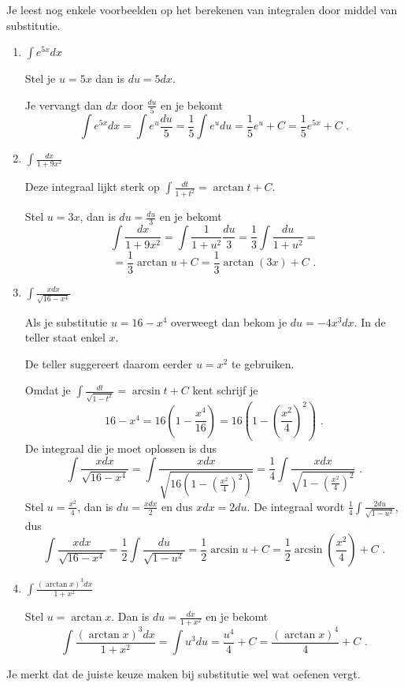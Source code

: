 \documentclass{article}
\begin{document}
Je leest nog enkele voorbeelden op het berekenen van integralen door middel van substitutie.

\vspace{2mm}

\begin{enumerate}

\item $\int e^{5x}dx$

Stel je $u=5x$ dan is $du=5dx$.

Je vervangt dan $dx$ door $\frac{du}{5}$ en je bekomt
\[
\int e^{5x}dx=\int e^u\frac{du}{5}=\frac{1}{5} \int e^udu=\frac{1}{5} e^u+C=\frac{1}{5}e^{5x}+C \text { .}
\]

\item $\int \frac{dx}{1+9x^2}$

Deze integraal lijkt sterk op $\int \frac{dt}{1+t^2}=\arctan t+C$.

Stel $u=3x$, dan is $du=\frac{du}{3}$ en je bekomt
\[
\int \frac{dx}{1+9x^2}=\int \frac{1}{1+u^2} \frac{du}{3} =\frac{1}{3} \int \frac{du}{1+u^2}=
\]
\[
=\frac{1}{3} \arctan u+C=\frac{1}{3} \arctan (3x)+C \text { .}
\]

\item $\int \frac{xdx}{\sqrt{16-x^4}}$

Als je substitutie $u=16-x^4$ overweegt dan bekom je $du=-4x^3dx$.
In de teller staat enkel $x$.

De teller suggereert daarom eerder $u=x^2$ te gebruiken.

Omdat je $\int \frac{dt}{\sqrt {1-t^2}}=\arcsin t+C$ kent schrijf je 
\[
16-x^4=16\left( 1-\frac{x^4}{16} \right)=16 \left( 1-\left( \frac{x^2}{4} \right)^2 \right) \text { .}
\]
De integraal die je moet oplossen is dus
\[
\int \frac{xdx}{\sqrt{16-x^4}}=\int \frac{xdx}{\sqrt {16 \left( 1-\left( \frac{x^2}{4} \right)^2 \right)   }}=\frac{1}{4} \int \frac{xdx}{ \sqrt{ 1-\left( \frac{x^2}{4} \right)^2   }} \text { .}
\]
Stel $u=\frac{x^2}{4}$, dan is $du =\frac{xdx}{2}$ en dus $xdx=2du$.
De integraal wordt $\frac{1}{4} \int \frac{2du}{\sqrt {1-u^2}}$, dus
\[
\int \frac{xdx}{\sqrt{16-x^4}}=\frac{1}{2} \int \frac{du}{\sqrt {1-u^2}}=\frac{1}{2} \arcsin u+C=\frac{1}{2} \arcsin \left( \frac{x^2}{4} \right)+C \text { .}
\]

\item $\int \frac{(\arctan x)^3dx}{1+x^2}$

Stel $u=\arctan x$.
Dan is $du=\frac{dx}{1+x^2}$ en je bekomt
\[
\int \frac{(\arctan x)^3dx}{1+x^2}=\int u^3du=\frac{u^4}{4}+C=\frac{(\arctan x)^4}{4}+C \text { .}
\]


\end{enumerate}

\vspace{3mm}

\noindent Je merkt dat de juiste keuze maken bij substitutie wel wat oefenen vergt.
\end{document}
